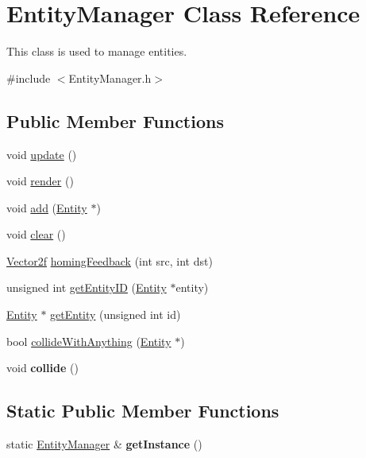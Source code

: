 \hypertarget{classEntityManager}{\section{Entity\-Manager Class Reference}
\label{classEntityManager}
}


This class is used to manage entities.  




{\ttfamily \#include $<$Entity\-Manager.\-h$>$}

\subsection*{Public Member Functions}
\begin{DoxyCompactItemize}
\item 
void \hyperlink{classEntityManager_abc6a2cc5077501f4b06d88f4ed3e7e31}{update} ()
\item 
void \hyperlink{classEntityManager_a663907dd48bbaf39344352a14b68d35a}{render} ()
\item 
void \hyperlink{classEntityManager_acc4cf521b2b9b33b37fd5685c2d1a504}{add} (\hyperlink{classEntity}{Entity} $\ast$)
\item 
void \hyperlink{classEntityManager_a322d6323d3d2b22581ca50efd1e253f5}{clear} ()
\item 
\hyperlink{classVector2}{Vector2f} \hyperlink{classEntityManager_a04a01dccea941da24815a4f58dd92a97}{homing\-Feedback} (int src, int dst)
\item 
unsigned int \hyperlink{classEntityManager_a2a13894e743374b43461f8586ab4880d}{get\-Entity\-I\-D} (\hyperlink{classEntity}{Entity} $\ast$entity)
\item 
\hyperlink{classEntity}{Entity} $\ast$ \hyperlink{classEntityManager_a2de0aa13460347a87b568a37cb0b11fc}{get\-Entity} (unsigned int id)
\item 
bool \hyperlink{classEntityManager_a68bec5ed352a62adc662166c0a09e5e8}{collide\-With\-Anything} (\hyperlink{classEntity}{Entity} $\ast$)
\item 
\hypertarget{classEntityManager_ad54b4992602323278fef716e20064554}{void {\bfseries collide} ()}\label{classEntityManager_ad54b4992602323278fef716e20064554}

\end{DoxyCompactItemize}
\subsection*{Static Public Member Functions}
\begin{DoxyCompactItemize}
\item 
\hypertarget{classEntityManager_a6d87bc4ad44459500e6a754de4724d1d}{static \hyperlink{classEntityManager}{Entity\-Manager} \& {\bfseries get\-Instance} ()}\label{classEntityManager_a6d87bc4ad44459500e6a754de4724d1d}

\end{DoxyCompactItemize}


